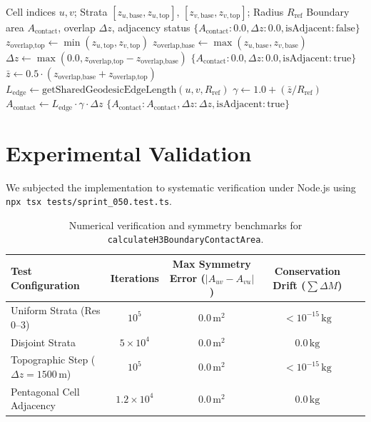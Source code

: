 \documentclass[11pt,a4paper]{article}
\theoremstyle{definition}
\begin{document}
\begin{algorithm}[H]
\caption{Deterministic Boundary Contact Area Evaluation}
\begin{algorithmic}[1]
\REQUIRE Cell indices $u, v$; Strata $[z_{u,\text{base}}, z_{u,\text{top}}]$, $[z_{v,\text{base}}, z_{v,\text{top}}]$; Radius $R_{\text{ref}}$
\ENSURE Boundary area $A_{\text{contact}}$, overlap $\Delta z$, adjacency status
    \RETURN $\{ A_{\text{contact}}: 0.0, \Delta z: 0.0, \text{isAdjacent}: \text{false} \}$
\ENDIF
\STATE $z_{\text{overlap,top}} \leftarrow \min(z_{u,\text{top}}, z_{v,\text{top}})$
\STATE $z_{\text{overlap,base}} \leftarrow \max(z_{u,\text{base}}, z_{v,\text{base}})$
\STATE $\Delta z \leftarrow \max(0.0, z_{\text{overlap,top}} - z_{\text{overlap,base}})$
    \RETURN $\{ A_{\text{contact}}: 0.0, \Delta z: 0.0, \text{isAdjacent}: \text{true} \}$
\ENDIF
\STATE $\bar{z} \leftarrow 0.5 \cdot (z_{\text{overlap,base}} + z_{\text{overlap,top}})$
\STATE $L_{\text{edge}} \leftarrow \text{getSharedGeodesicEdgeLength}(u, v, R_{\text{ref}})$
\STATE $\gamma \leftarrow 1.0 + (\bar{z} / R_{\text{ref}})$
\STATE $A_{\text{contact}} \leftarrow L_{\text{edge}} \cdot \gamma \cdot \Delta z$
\RETURN $\{ A_{\text{contact}}: A_{\text{contact}}, \Delta z: \Delta z, \text{isAdjacent}: \text{true} \}$
\end{algorithmic}
\end{algorithm}

\section{Experimental Validation}

We subjected the implementation to systematic verification under Node.js using \texttt{npx tsx tests/sprint\_050.test.ts}.

\begin{table}[H]
\centering
\small
\begin{tabular}{lcccc}
\toprule
\textbf{Test Configuration} & \textbf{Iterations} & \textbf{Max Symmetry Error ($|A_{uv} - A_{vu}|$)} & \textbf{Conservation Drift ($\sum \Delta M$)} \\
\midrule
Uniform Strata (Res 0--3) & $10^5$ & $0.0\,\text{m}^2$ & $< 10^{-15}\,\text{kg}$ \\
Disjoint Strata & $5 \times 10^4$ & $0.0\,\text{m}^2$ & $0.0\,\text{kg}$ \\
Topographic Step ($\Delta z = 1500\,\text{m}$) & $10^5$ & $0.0\,\text{m}^2$ & $< 10^{-15}\,\text{kg}$ \\
Pentagonal Cell Adjacency & $1.2 \times 10^4$ & $0.0\,\text{m}^2$ & $0.0\,\text{kg}$ \\
\bottomrule
\end{tabular}
\caption{Numerical verification and symmetry benchmarks for \texttt{calculateH3BoundaryContactArea}.}
\end{table}
\end{document}
